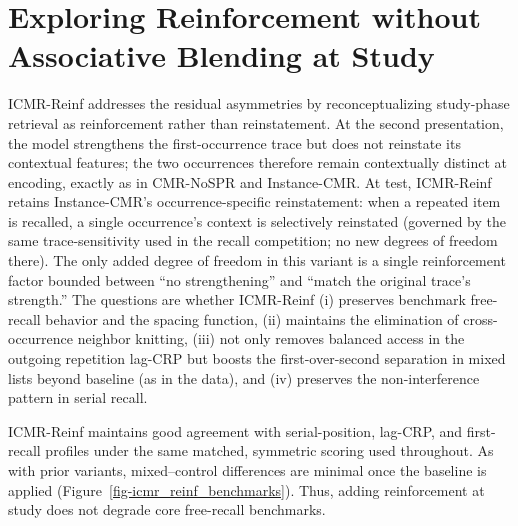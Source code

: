 \documentclass[
  man,
  floatsintext,
  longtable,
  nolmodern,
  notxfonts,
  notimes,
  draftfirst,
  colorlinks=true,linkcolor=blue,citecolor=blue,urlcolor=blue]{apa7}
\begin{document}
\section{Exploring Reinforcement without Associative Blending at
Study}\label{exploring-reinforcement-without-associative-blending-at-study}

ICMR-Reinf addresses the residual asymmetries by reconceptualizing
study-phase retrieval as reinforcement rather than reinstatement. At the
second presentation, the model strengthens the first-occurrence trace
but does not reinstate its contextual features; the two occurrences
therefore remain contextually distinct at encoding, exactly as in
CMR-NoSPR and Instance-CMR. At test, ICMR-Reinf retains Instance-CMR's
occurrence-specific reinstatement: when a repeated item is recalled, a
single occurrence's context is selectively reinstated (governed by the
same trace-sensitivity used in the recall competition; no new degrees of
freedom there). The only added degree of freedom in this variant is a
single reinforcement factor bounded between ``no strengthening'' and
``match the original trace's strength.'' The questions are whether
ICMR-Reinf (i) preserves benchmark free-recall behavior and the spacing
function, (ii) maintains the elimination of cross-occurrence neighbor
knitting, (iii) not only removes balanced access in the outgoing
repetition lag-CRP but boosts the first-over-second separation in mixed
lists beyond baseline (as in the data), and (iv) preserves the
non-interference pattern in serial recall.

ICMR-Reinf maintains good agreement with serial-position, lag-CRP, and
first-recall profiles under the same matched, symmetric scoring used
throughout. As with prior variants, mixed--control differences are
minimal once the baseline is applied
(Figure~\ref{fig-icmr_reinf_benchmarks}). Thus, adding reinforcement at
study does not degrade core free-recall benchmarks.
\end{document}
